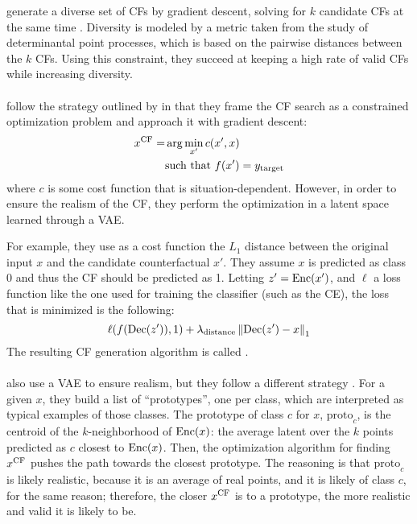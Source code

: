 \documentclass[../main.tex]{subfiles}
\begin{document}
\citeauthor{mothilalExplaining2020} generate a diverse set of CFs by gradient descent, solving for $k$ candidate CFs at the same time \cite{mothilalExplaining2020}.
Diversity is modeled by a metric taken from the study of determinantal point processes, which is based on the pairwise distances between the $k$ CFs.
Using this constraint, they succeed at keeping a high rate of valid CFs while increasing diversity.

\paragraph{\revise{}}
\label{par:revise}

\citeauthor{joshiRealistic2019} follow the strategy outlined by \citeauthor{wachterCounterfactual2017} in that they frame the CF search as a constrained optimization problem and approach it with gradient descent:
\begin{align*}
	x^\mathrm{CF} = & \arg\min_{x'} c(x', x)              \\
	         & \text{such that } f(x') = y_{\mathrm{target}}
\end{align*}
where $c$ is some cost function that is situation-dependent.
However, in order to ensure the realism of the CF, they perform the optimization in a latent space learned through a VAE.

For example, they use as a cost function the $L_1$ distance between the original input $x$ and the candidate counterfactual $x'$.
They assume $x$ is predicted as class 0 and thus the CF should be predicted as 1.
Letting $z'=\operatorname{Enc}(x')$, and $\ell$ a loss function like the one used for training the classifier (such as the CE), the loss that is minimized is the following:
\begin{equation}
	\ell(f(\operatorname{Dec}(z')), 1)
	+ \lambda_\text{distance} \left\lVert\operatorname{Dec}(z') - x\right\rVert_1
\end{equation}
The resulting CF generation algorithm is called \revise{} \cite{joshiRealistic2019}.

\paragraph{}

\citeauthor{vanlooverenInterpretable2021} also use a VAE to ensure realism, but they follow a different strategy \cite{vanlooverenInterpretable2021}.
For a given $x$, they build a list of ``prototypes'', one per class, which are interpreted as typical examples of those classes.
The prototype of class $c$ for $x$, $\text{proto}_c$, is the centroid of the $k$-neighborhood of $\operatorname{Enc}(x)$: the average latent over the $k$ points predicted as $c$ closest to $\operatorname{Enc}(x)$.
Then, the optimization algorithm for finding $x^\mathrm{CF}$ pushes the path towards the closest prototype.
The reasoning is that $\text{proto}_c$ is likely realistic, because it is an average of real points, and it is likely of class $c$, for the same reason; therefore, the closer $x^\mathrm{CF}$ is to a prototype, the more realistic and valid it is likely to be.
\end{document}

